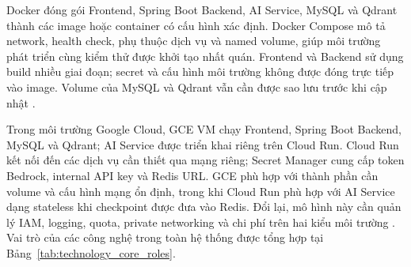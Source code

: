 Docker đóng gói Frontend, Spring Boot Backend, AI Service, MySQL và Qdrant thành các
image hoặc container có cấu hình xác định. Docker Compose mô tả network, health check,
phụ thuộc dịch vụ và named volume, giúp môi trường phát triển cùng kiểm thử được khởi
tạo nhất quán. Frontend và Backend sử dụng build nhiều giai đoạn; secret và cấu hình
môi trường không được đóng trực tiếp vào image. Volume của MySQL và Qdrant vẫn cần
được sao lưu trước khi cập nhật \parencite{dockerdocs2026,dockercompose2026}.

Trong môi trường Google Cloud, GCE VM chạy Frontend, Spring Boot Backend, MySQL và
Qdrant; AI Service được triển khai riêng trên Cloud Run. Cloud Run kết nối đến các
dịch vụ cần thiết qua mạng riêng; Secret Manager cung cấp token Bedrock, internal API
key và Redis URL. GCE phù hợp với thành phần cần volume và cấu hình mạng ổn định,
trong khi Cloud Run phù hợp với AI Service dạng stateless khi checkpoint được đưa vào
Redis. Đổi lại, mô hình này cần quản lý IAM, logging, quota, private networking và
chi phí trên hai kiểu môi trường \parencite{gce2026,cloudrun2026}. Vai trò của
các công nghệ trong toàn hệ thống được tổng hợp tại Bảng~\ref{tab:technology_core_roles}.

